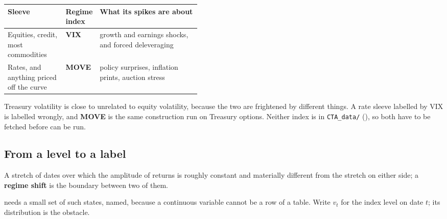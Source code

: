 \begin{tabularx}{\linewidth}{|>{\raggedright\arraybackslash}p{0.30\linewidth}|>{\raggedright\arraybackslash}p{0.14\linewidth}|X|}
\hline
\textbf{Sleeve} & \textbf{Regime index} & \textbf{What its spikes are about} \\ \hline
Equities, credit, most commodities & \textbf{VIX}
  & growth and earnings shocks, and forced deleveraging \\ \hline
Rates, and anything priced off the curve & \textbf{MOVE}
  & policy surprises, inflation prints, auction stress \\ \hline
\end{tabularx}

\begin{note}
Treasury volatility is close to unrelated to equity volatility, because the two are frightened by
different things. A rate sleeve labelled by VIX is labelled wrongly, and \textbf{MOVE} is the same
construction run on Treasury options. Neither index is in \texttt{CTA\_data/}
(), so both have to be fetched before
 can be run.
\end{note}

\subsection{From a level to a label}\label{sec:level-to-label}

\begin{definition}\label{def:vol-regime}
A stretch of dates over which the amplitude of returns is roughly constant and materially different
from the stretch on either side; a \textbf{regime shift} is the boundary between two of them.
\end{definition}

 needs a small set of such states, named, because a continuous variable
cannot be a row of a table. Write $v_t$ for the index level on date $t$; its distribution is the
obstacle.


